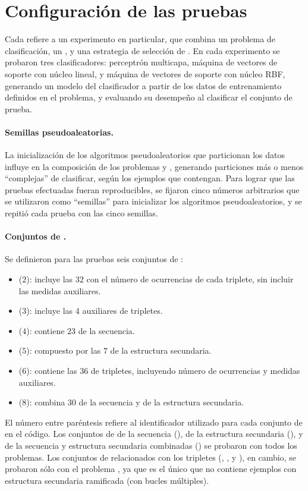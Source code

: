 %
%
%
\section{Configuración de las pruebas}
%
Cada  refiere a un experimento en particular, que combina un
{problema} de clasificación, un , y una
estrategia de selección de .
En cada experimento se probaron tres clasificadores: perceptrón
multicapa, máquina de vectores de soporte con núcleo lineal, y máquina
de vectores de soporte con núcleo RBF, generando un modelo del
clasificador a partir de los datos de entrenamiento definidos en el
problema, y evaluando su desempeño al clasificar el conjunto de
prueba.

\paragraph{Semillas pseudoaleatorias.}
La inicialización de los algoritmos pseudoaleatorios que particionan
los datos influye en la composición de los problemas \prob\mipred{} y
\prob\micropred{}, generando particiones más o menos ``complejas'' de
clasificar, según los ejemplos que contengan.
Para lograr que las pruebas efectuadas fueran reproducibles, se
fijaron cinco números arbitrarios que se utilizaron como ``semillas''
para inicializar los algoritmos pseudoaleatorios, y se repitió cada
prueba con las cinco semillas.

\paragraph{Conjuntos de .}
Se definieron para las pruebas seis conjuntos de :
%
\begin{itemize}
\item{} ($2$): incluye las $32$  con el número de
  ocurrencias de cada triplete, sin incluir las medidas auxiliares.
\item{} ($3$): incluye las $4$  auxiliares de
  tripletes.
\item{} ($4$): contiene $23$  de la secuencia.
\item{} ($5$): compuesto por las $7$  de la estructura
  secundaria.
\item{} ($6$): contiene las $36$  de tripletes,
  incluyendo número de ocurrencias y medidas auxiliares.
\item{} ($8$): combina $30$  de la secuencia y de la
  estructura secundaria.
\end{itemize}
%
El número entre paréntesis refiere al identificador utilizado para
cada conjunto de  en el código.
Los conjuntos de  de la secuencia (), de la
estructura secundaria (), y de la secuencia y estructura
secundaria combinadas () se probaron con todos los
problemas.
Los conjuntos de  relacionados con los tripletes (,
, y ), en cambio, se probaron sólo con el problema
\prob\tripletsvm{}, ya que es el único que no contiene ejemplos con
estructura secundaria ramificada (con bucles múltiples).
